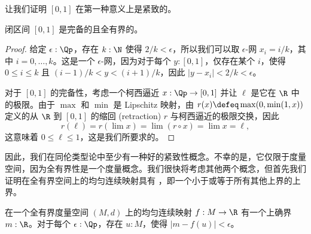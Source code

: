 让我们证明 $[0,1]$ 在第一种意义上是紧致的。

\begin{thm} \label{analysis-interval-ctb}
%
%
闭区间 $[0,1]$ 是完备的且全有界的。
\end{thm}

\begin{proof}
  给定 $\epsilon : \Qp$，存在 $k : \N$ 使得 $2/k < \epsilon$，所以我们可以取 $\epsilon$-网 $x_i = i/k$，其中 $i = 0, \ldots, k$。这是一个 $\epsilon$-网，因为对于每个 $y : [0,1]$，仅存在某个 $i$，使得 $0 \leq i \leq k$ 且 $(i - 1)/k < y < (i+1)/k$，因此 $|y - x_i| < 2/k < \epsilon$。

  对于 $[0,1]$ 的完备性，考虑一个柯西逼近 $x : \Qp \to [0,1]$ 并让 $\ell$ 是它在 $\R$ 中的极限。由于 $\max$ 和 $\min$ 是 Lipschitz 映射，由 $r(x) \defeq \max(0, \min(1, x))$ 定义的从 $\R$ 到 $[0,1]$ 的缩回 (retraction) $r$ 与柯西逼近的极限交换，因此
  \begin{equation*}
    r(\ell) =
    r (\lim x) =
    \lim (r \circ x) =
    \lim x =
    \ell,
  \end{equation*}
  这意味着 $0 \leq \ell \leq 1$，这是我们所要求的。
\end{proof}

因此，我们在同伦类型论中至少有一种好的紧致性概念。不幸的是，它仅限于度量空间，因为全有界性是一个度量概念。我们很快将考虑其他两个概念，但首先我们证明在全有界空间上的均匀连续映射具有 ，即一个小于或等于所有其他上界的上界。

\begin{thm} \label{ctb-uniformly-continuous-sup}
%
在一个全有界度量空间 $(M, d)$ 上的均匀连续映射 $f : M \to \R$ 有一个上确界 $m : \R$。对于每个 $\epsilon : \Qp$，存在 $u : M$，使得 $|m - f(u)| < \epsilon$。
\end{thm}

